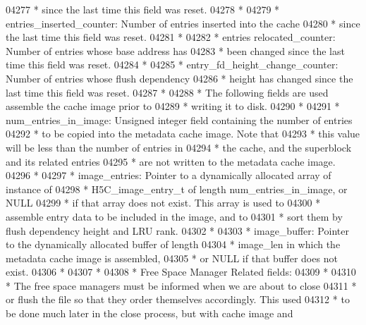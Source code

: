 \begin{DoxyCode}
04277 \textcolor{comment}{ *      since the last time this field was reset.}
04278 \textcolor{comment}{ *}
04279 \textcolor{comment}{ * entries\_inserted\_counter: Number of entries inserted into the cache }
04280 \textcolor{comment}{ *      since the last time this field was reset.}
04281 \textcolor{comment}{ *}
04282 \textcolor{comment}{ * entries relocated\_counter: Number of entries whose base address has}
04283 \textcolor{comment}{ *      been changed since the last time this field was reset.}
04284 \textcolor{comment}{ *}
04285 \textcolor{comment}{ * entry\_fd\_height\_change\_counter: Number of entries whose flush dependency}
04286 \textcolor{comment}{ *      height has changed since the last time this field was reset.}
04287 \textcolor{comment}{ *}
04288 \textcolor{comment}{ * The following fields are used assemble the cache image prior to }
04289 \textcolor{comment}{ * writing it to disk.}
04290 \textcolor{comment}{ *}
04291 \textcolor{comment}{ * num\_entries\_in\_image: Unsigned integer field containing the number of entries}
04292 \textcolor{comment}{ *      to be copied into the metadata cache image.  Note that }
04293 \textcolor{comment}{ *      this value will be less than the number of entries in }
04294 \textcolor{comment}{ *      the cache, and the superblock and its related entries }
04295 \textcolor{comment}{ *      are not written to the metadata cache image.}
04296 \textcolor{comment}{ *}
04297 \textcolor{comment}{ * image\_entries: Pointer to a dynamically allocated array of instance of}
04298 \textcolor{comment}{ *      H5C\_image\_entry\_t of length num\_entries\_in\_image, or NULL}
04299 \textcolor{comment}{ *      if that array does not exist.  This array is used to}
04300 \textcolor{comment}{ *      assemble entry data to be included in the image, and to }
04301 \textcolor{comment}{ *      sort them by flush dependency height and LRU rank.}
04302 \textcolor{comment}{ * }
04303 \textcolor{comment}{ * image\_buffer: Pointer to the dynamically allocated buffer of length}
04304 \textcolor{comment}{ *      image\_len in which the metadata cache image is assembled, }
04305 \textcolor{comment}{ *      or NULL if that buffer does not exist.}
04306 \textcolor{comment}{ *}
04307 \textcolor{comment}{ *}
04308 \textcolor{comment}{ * Free Space Manager Related fields:}
04309 \textcolor{comment}{ *}
04310 \textcolor{comment}{ * The free space managers must be informed when we are about to close }
04311 \textcolor{comment}{ * or flush the file so that they order themselves accordingly.  This used}
04312 \textcolor{comment}{ * to be done much later in the close process, but with cache image and }

\end{DoxyCode}
